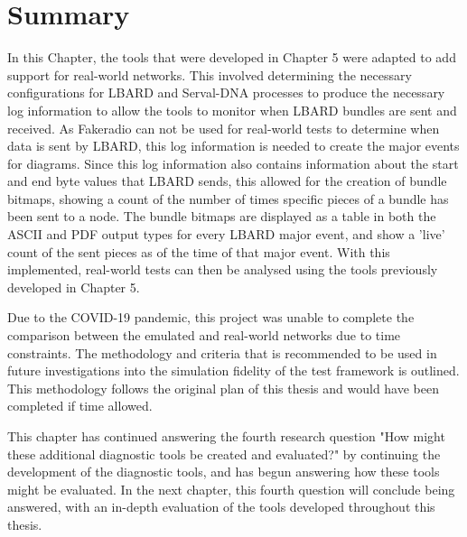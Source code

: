 \section{Summary}
In this Chapter, the tools that were developed in Chapter 5 were adapted to add support for real-world networks.
This involved determining the necessary configurations for LBARD and Serval-DNA processes to produce the necessary log information to allow the tools to monitor when LBARD bundles are sent and received.
As Fakeradio can not be used for real-world tests to determine when data is sent by LBARD, this log information is needed to create the major events for diagrams.
Since this log information also contains information about the start and end byte values that LBARD sends, this allowed for the creation of bundle bitmaps, showing a count of the number of times specific pieces of a bundle has been sent to a node.
The bundle bitmaps are displayed as a table in both the ASCII and PDF output types for every LBARD major event, and show a 'live' count of the sent pieces as of the time of that major event.
With this implemented, real-world tests can then be analysed using the tools previously developed in Chapter 5.

Due to the COVID-19 pandemic, this project was unable to complete the comparison between the emulated and real-world networks due to time constraints. 
The methodology and criteria that is recommended to be used in future investigations into the simulation fidelity of the test framework is outlined. 
This methodology follows the original plan of this thesis and would have been completed if time allowed.

This chapter has continued answering the fourth research question "How might these additional diagnostic tools be created and evaluated?" by continuing the development of the diagnostic tools, and has begun answering how these tools might be evaluated.
In the next chapter, this fourth question will conclude being answered, with an in-depth evaluation of the tools developed throughout this thesis.
